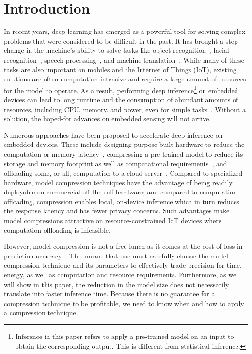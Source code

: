 \section{Introduction}
In recent years, deep learning has emerged as a powerful tool for solving complex problems that were considered to be difficult in the
past. It has brought a step change in the machine's ability to solve tasks like object recognition~\cite{donahue14,he2016deep}, facial
recognition~\cite{parkhi2015deep,sun2014deep}, speech processing~\cite{pmlrv48amodei16}, and machine translation~\cite{bahdanau2014neural}.
While many of these tasks are also important on mobiles and the Internet of Things (IoT), existing solutions are often
computation-intensive and require a large amount of resources for the model to operate. As a result, performing deep
inference\footnote{Inference in this paper refers to apply a pre-trained model on an input to obtain the corresponding output. This is
different from statistical inference.} on embedded devices can lead to long runtime and the consumption of abundant amounts of resources,
including CPU, memory, and power, even for simple tasks~\cite{CanzianiPC16}. Without a solution,
 the hoped-for advances on embedded sensing will not arrive.


Numerous approaches have been proposed to accelerate deep inference on embedded devices. These include designing purpose-built hardware to
reduce the computation or memory latency~\cite{georgiev2017low}, compressing a pre-trained model to reduce its storage and memory footprint
as well as computational requirements~\cite{Han:2016:EEI:3001136.3001163}, and offloading some, or all, computation to a cloud
server~\cite{Kang2017neurosurgeon,teerapittayanon2017distributed}. Compared to specialized hardware, model compression techniques have the
advantage of being readily deployable on commercial-off-the-self hardware; and compared to computation offloading, compression enables
local, on-device inference which in turn reduces the response latency and has fewer privacy concerns. Such advantages make model
compressions attractive on resource-constrained IoT devices where computation offloading is infeasible.


However, model compression is not a free lunch as it comes at the cost of loss in prediction accuracy~\cite{Cheng2017A}. This means that
one must carefully choose the model compression technique and its parameters to effectively trade precision for time, energy, as well as
computation and resource requirements. Furthermore, as we will show in this paper, the reduction in the model size does not necessarily
translate into faster inference time. Because there is no guarantee for a compression technique to be profitable, we need to know when and
how to apply a compression technique.

